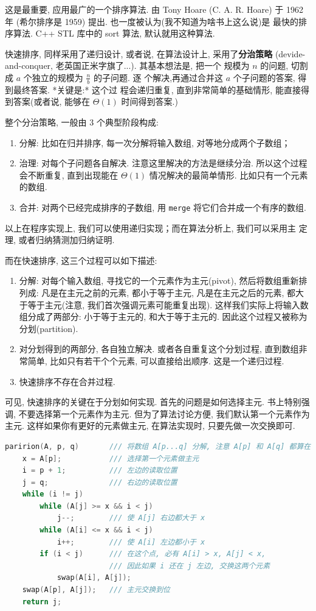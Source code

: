 \documentclass[a4paper]{ctexart}
\theoremstyle{definition}
\theoremstyle{definition}
\begin{document}
这是最重要, 应用最广的一个排序算法. 由 Tony Hoare (C. A. R. Hoare) 于
1962 年 (希尔排序是 1959) 提出. 也一度被认为(我不知道为啥书上这么说)是
最快的排序算法. C++ STL 库中的 sort 算法, 默认就用这种算法.

快速排序, 同样采用了递归设计, 或者说, 在算法设计上, 采用了{\bf 分治策略}
(devide-and-conquer, 老英国正米字旗了...). 其基本想法是, 把一个
规模为 $n$ 的问题, 切割成 $a$ 个独立的规模为 $\frac{n}{b}$ 的子问题. 逐
个解决,再通过合并这 $a$ 个子问题的答案, 得到最终答案. *关键是:* 这个过
程会递归重复, 直到非常简单的基础情形, 能直接得到答案(或者说, 能够在
$\Theta(1)$ 时间得到答案.)

整个分治策略, 一般由 3 个典型阶段构成:

\begin{enumerate}
\item 分解: 比如在归并排序, 每一次分解将输入数组, 对等地分成两个子数组；
\item 治理: 对每个子问题各自解决. 注意这里解决的方法是继续分治.
  所以这个过程会不断重复, 直到出现能在 $\Theta(1)$ 情况解决的最简单情形.
  比如只有一个元素的数组. 
\item 合并: 对两个已经完成排序的子数组, 用 \verb|merge|
  将它们合并成一个有序的数组.
\end{enumerate}
   
以上在程序实现上, 我们可以使用递归实现；而在算法分析上, 我们可以采用主
定理, 或者归纳猜测加归纳证明.

而在快速排序, 这三个过程可以如下描述:

\begin{enumerate}
\item 分解: 对每个输入数组, 寻找它的一个元素作为主元(pivot),
  然后将数组重新排列成: 凡是在主元之前的元素, 都小于等于主元,
  凡是在主元之后的元素, 都大于等于主元(注意, 我们首次强调元素可能重复出现).
  这样我们实际上将输入数组分成了两部分: 小于等于主元的, 和大于等于主元的.
  因此这个过程又被称为分划(partition).
\item 对分划得到的两部分, 各自独立解决. 或者各自重复这个分划过程,
  直到数组非常简单, 比如只有若干个个元素, 可以直接给出顺序. 这是一个递归过程.
\item 快速排序不存在合并过程.
\end{enumerate}

可见, 快速排序的关键在于分划如何实现. 首先的问题是如何选择主元.
书上特别强调, 不要选择第一个元素作为主元. 但为了算法讨论方便,
我们默认第一个元素作为主元. 这样如果你有更好的元素做主元,
在算法实现时, 只要先做一次交换即可.


\begin{lstlisting}[language=C++]
paririon(A, p, q)       /// 将数组 A[p...q] 分解, 注意 A[p] 和 A[q] 都算在内.
    x = A[p];           /// 选择第一个元素做主元
	i = p + 1;          /// 左边的读取位置 
	j = q;              /// 右边的读取位置
	while (i != j)
		while (A[j] >= x && i < j)
			j--;        /// 使 A[j] 右边都大于 x
		while (A[i] <= x && i < j)
			i++;        /// 使 A[i] 左边都小于 x
		if (i < j)      /// 在这个点, 必有 A[i] > x, A[j] < x,
	                    /// 因此如果 i 还在 j 左边, 交换这两个元素
            swap(A[i], A[j]);
	swap(A[p], A[j]);   /// 主元交换到位
	return j;
\end{lstlisting}
\end{document}

